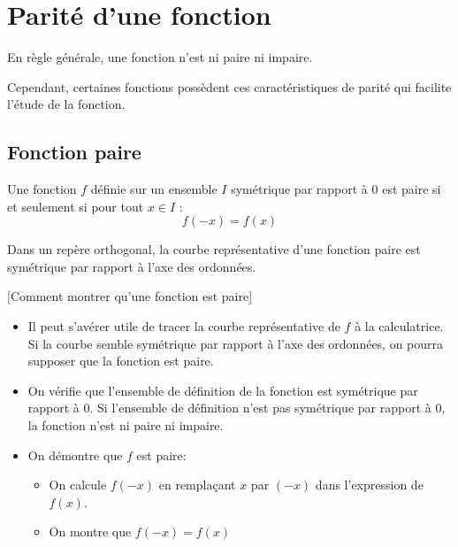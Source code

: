 \section{Parité d'une fonction}

En règle générale, une fonction n'est ni paire ni impaire. 

\noindent Cependant, certaines fonctions possèdent ces caractéristiques de parité qui facilite l'étude de la fonction.

\vspace{-2mm}
\subsection{Fonction paire}

\vspace{-1mm}
\begin{defi}{}{}
Une fonction $f$ définie sur un ensemble $I$ symétrique par rapport à $0$ est paire si et seulement si pour tout $x \in I$ : $$f(-x)=f(x)$$
\end{defi}

\begin{prop}{}{}
Dans un repère orthogonal, la courbe représentative d'une fonction paire est symétrique par rapport à l'axe des ordonnées.
\end{prop}

\begin{methode}{}{}[Comment montrer qu'une fonction est paire]
\begin{itemize}
\item Il peut s'avérer utile de tracer la courbe représentative de $f$ à la calculatrice.
Si la courbe semble symétrique par rapport à l'axe des ordonnées, on pourra supposer que la fonction est paire.

\item On vérifie que l'ensemble de définition de la fonction est symétrique par rapport à 0. Si l'ensemble de définition n'est pas symétrique par rapport à 0, la fonction n'est ni paire ni impaire.

\item On démontre que $f$ est paire:
\begin{itemize}
\item  On calcule $f\left(-x\right)$ en remplaçant $x$ par $\left(-x\right)$ dans l'expression de $f\left(x\right)$.
\item  On montre que $f\left(-x\right)=f\left(x\right)$
\end{itemize}
\end{itemize}
\end{methode}

